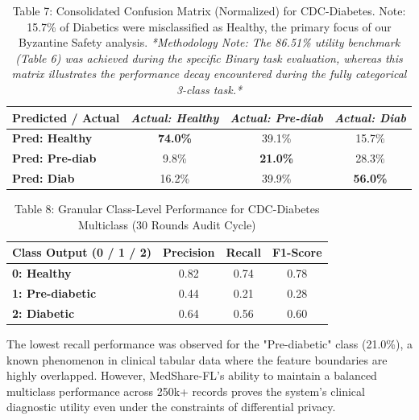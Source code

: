 \documentclass[10pt, a4paper, twocolumn]{article}
\begin{document}
\begin{table}[hbt!]
\centering
\scriptsize
\begin{tabular}{lccc}
\toprule
\textbf{Predicted / Actual} & \textit{Actual: Healthy} & \textit{Actual: Pre-diab} & \textit{Actual: Diab} \\
\midrule
\textbf{Pred: Healthy} & \textbf{74.0\%} & 39.1\% & 15.7\% \\
\textbf{Pred: Pre-diab} & 9.8\% & \textbf{21.0\%} & 28.3\% \\
\textbf{Pred: Diab} & 16.2\% & 39.9\% & \textbf{56.0\%} \\
\bottomrule
\end{tabular}
\caption{Table 7: Consolidated Confusion Matrix (Normalized) for CDC-Diabetes. Note: 15.7\% of Diabetics were misclassified as Healthy, the primary focus of our Byzantine Safety analysis. \textit{*Methodology Note: The 86.51\% utility benchmark (Table 6) was achieved during the specific Binary task evaluation, whereas this matrix illustrates the performance decay encountered during the fully categorical 3-class task.*}}
\end{table}

\begin{table}[hbt!]
\centering
\scriptsize
\begin{tabular}{lccc}
\toprule
\textbf{Class Output (0 / 1 / 2)} & \textbf{Precision} & \textbf{Recall} & \textbf{F1-Score} \\
\midrule
\textbf{0: Healthy} & 0.82 & 0.74 & 0.78 \\
\textbf{1: Pre-diabetic} & 0.44 & 0.21 & 0.28 \\
\textbf{2: Diabetic} & 0.64 & 0.56 & 0.60 \\
\bottomrule
\end{tabular}
\caption{Table 8: Granular Class-Level Performance for CDC-Diabetes Multiclass (30 Rounds Audit Cycle)}
\end{table}

The lowest recall performance was observed for the "Pre-diabetic" class (21.0\%), a known phenomenon in clinical tabular data where the feature boundaries are highly overlapped. However, MedShare-FL's ability to maintain a balanced multiclass performance across 250k+ records proves the system's clinical diagnostic utility even under the constraints of differential privacy.
\end{document}
